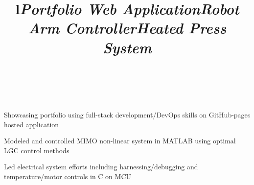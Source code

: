 \documentclass[mm]{res}
\begin{document}
\begin{resume}

\toprule

\section{\headingprojects}
\begin{format}
\title{l}\\
\body\\
\end{format}


\title{\textsl{Portfolio Web Application}}
\begin{position}
\tb Showcasing portfolio using full-stack development/DevOps skills on GitHub-pages hosted application
\end{position}

\title{\textsl{Robot Arm Controller}}
\begin{position}
\tb Modeled and controlled MIMO non-linear system in MATLAB using optimal LGC control methods
\end{position}

\title{\textsl{Heated Press System}}
\begin{position}
\tb Led electrical system efforts including harnessing/debugging and temperature/motor controls in C on MCU
\end{position}





\end{resume}
\end{document}
